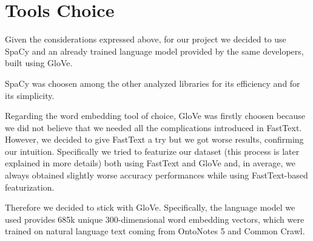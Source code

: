 \section{Tools Choice}

Given the considerations expressed above, for our project we decided to use SpaCy and an already trained language model provided by the same developers, built using GloVe.

SpaCy was choosen among the other analyzed libraries for its efficiency and for its simplicity. 

Regarding the word embedding tool of choice, GloVe was firstly choosen because we did not believe that we needed all the complications introduced in FastText. However, we decided to give FastText a try but we got worse results, confirming our intuition. Specifically we tried to featurize our dataset (this process is later explained in more details) both using FastText and GloVe and, in average, we always obtained slightly worse accuracy performances while using FastText-based featurization.

Therefore we decided to stick with GloVe. Specifically, the language model we used provides 685k unique 300-dimensional word embedding vectors, which were trained on natural language text coming from OntoNotes 5\cite{ontonotes5} and Common Crawl\cite{common-crawl}.